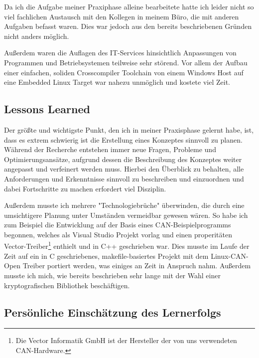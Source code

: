 Da ich die Aufgabe meiner Praxiphase alleine bearbeitete hatte ich leider nicht so viel fachlichen Austausch mit den Kollegen in meinem Büro, die mit anderen Aufgaben befasst waren. Dies war jedoch aus den bereits beschriebenen Gründen nicht anders möglich.

Außerdem waren die Auflagen des IT-Services hinsichtlich Anpassungen von Programmen und Betriebsystemen teilweise sehr störend. Vor allem der Aufbau einer einfachen, soliden Crosscompiler Toolchain von einem Windows Host auf eine Embedded Linux Target war nahezu unmöglich und kostete viel Zeit.


\subsection{Lessons Learned}
Der größte und wichtigste Punkt, den ich in meiner Praxisphase gelernt habe, ist, dass es extrem schwierig ist die Erstellung eines Konzeptes sinnvoll zu planen. 
Während der Recherche entstehen immer neue Fragen, Probleme und Optimierungsansätze, aufgrund dessen die Beschreibung des Konzeptes weiter angepasst und verfeinert werden muss. 
Hierbei den Überblick zu behalten, alle Anforderungen und Erkenntnisse sinnvoll zu beschreiben und einzuordnen und dabei Fortschritte zu machen erfordert viel Disziplin. %

Außerdem musste ich mehrere "Technologiebrüche" überwinden, die durch eine umsichtigere Planung unter Umständen vermeidbar gewesen wären. So habe ich zum Beispiel die Entwicklung auf der Basis eines CAN-Beispielprogramms begonnen, welches als Visual Studio Projekt vorlag und einen properitäten Vector-Treiber\footnote{Die Vector Informatik GmbH ist der Hersteller der von uns verwendeten CAN-Hardware.} enthielt und in C++ geschrieben war. Dies musste im Laufe der Zeit auf ein in C geschriebenes, makefile-basiertes Projekt mit dem Linux-CAN-Open Treiber portiert werden, was einiges an Zeit in Anspruch nahm. 
Außerdem musste ich mich, wie bereits beschrieben sehr lange mit der Wahl einer kryptografischen Bibliothek beschäftigen.

\subsection{Persönliche Einschätzung des Lernerfolgs}

